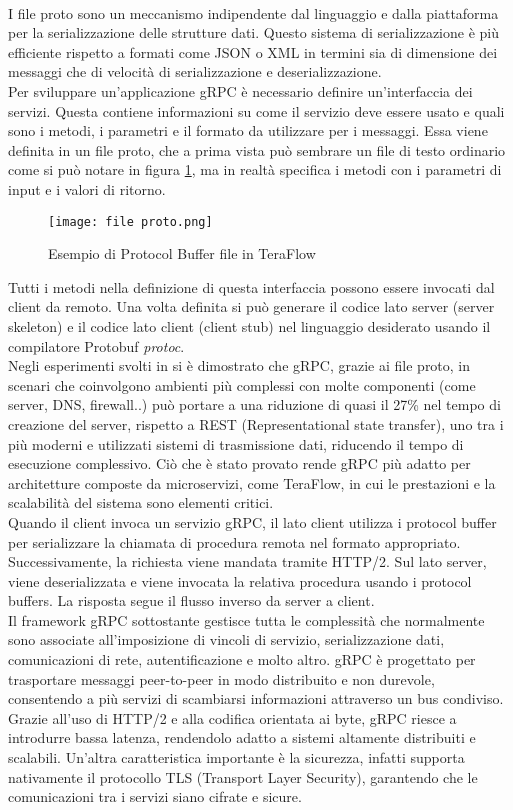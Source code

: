 \\I file proto sono un meccanismo indipendente dal linguaggio e dalla piattaforma per la serializzazione delle strutture dati. Questo sistema di serializzazione è più efficiente rispetto a formati come JSON o XML
in termini sia di dimensione dei messaggi che di velocità di serializzazione e deserializzazione.
\\Per sviluppare un'applicazione gRPC è necessario definire un'interfaccia dei servizi. Questa contiene informazioni su come il servizio deve essere usato e quali sono i metodi, i parametri e 
il formato da utilizzare per i messaggi. Essa viene definita in un file proto, che a prima vista può sembrare un file di testo ordinario come si può notare in figura \ref{fig:proto}, ma in realtà specifica i metodi con i parametri di input e i valori di ritorno.
\begin{figure}[h]
    \centering
   \texttt{[image: file proto.png]}
    \caption{Esempio di Protocol Buffer file in TeraFlow \cite{ProtoBuf}}
    \label{fig:proto}
\end{figure}
Tutti i metodi nella definizione di questa interfaccia possono essere invocati dal client da remoto.
Una volta definita si può generare il codice lato server (server skeleton) e il codice lato client (client stub) nel linguaggio desiderato usando il compilatore Protobuf \textit{protoc}\cite{librogrpc}.
\\Negli esperimenti svolti in \cite{espgrpc} si è dimostrato che gRPC, grazie ai file proto, in scenari che coinvolgono ambienti più complessi con molte componenti (come server, DNS, firewall..)
può portare a una riduzione di quasi il 27\% nel tempo di creazione del server, rispetto a REST (Representational state transfer), uno tra i più moderni e utilizzati sistemi di trasmissione dati, riducendo il tempo di esecuzione complessivo.
Ciò che è stato provato rende gRPC più adatto per architetture composte da microservizi, come TeraFlow, in cui le prestazioni e la scalabilità del sistema sono elementi critici.
\\Quando il client invoca un servizio gRPC, il lato client utilizza i protocol buffer per serializzare la chiamata di procedura remota nel formato appropriato. 
Successivamente, la richiesta viene mandata tramite HTTP/2. Sul lato server, viene deserializzata e viene invocata la relativa procedura usando i protocol buffers.
La risposta segue il flusso inverso da server a client\cite{librogrpc}.
\\Il framework gRPC sottostante gestisce tutta le complessità che normalmente sono associate all'imposizione di vincoli di servizio, serializzazione dati, comunicazioni di rete, autentificazione e molto altro.
gRPC è progettato per trasportare messaggi peer-to-peer in modo distribuito e non durevole, consentendo a più servizi di scambiarsi informazioni attraverso un bus condiviso.
Grazie all'uso di HTTP/2 e alla codifica orientata ai byte, gRPC riesce a introdurre bassa latenza, rendendolo adatto a sistemi altamente distribuiti e scalabili. 
Un'altra caratteristica importante è la sicurezza, infatti supporta nativamente il protocollo TLS (Transport Layer Security), garantendo che le comunicazioni tra i servizi siano cifrate e sicure.


